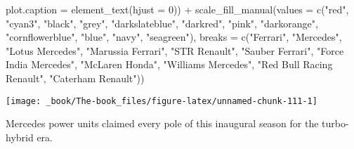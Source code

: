 \documentclass[
]{book}
\newenvironment{Shaded}{\begin{snugshade}}{\end{snugshade}}
\newcommand{\AttributeTok}[1]{\textcolor[rgb]{0.77,0.63,0.00}{#1}}
\newcommand{\DecValTok}[1]{\textcolor[rgb]{0.00,0.00,0.81}{#1}}
\newcommand{\FunctionTok}[1]{\textcolor[rgb]{0.00,0.00,0.00}{#1}}
\newcommand{\NormalTok}[1]{#1}
\newcommand{\SpecialCharTok}[1]{\textcolor[rgb]{0.00,0.00,0.00}{#1}}
\newcommand{\StringTok}[1]{\textcolor[rgb]{0.31,0.60,0.02}{#1}}
\begin{document}
\begin{Shaded}
\begin{Highlighting}[]
        \AttributeTok{plot.caption =} \FunctionTok{element\_text}\NormalTok{(}\AttributeTok{hjust =} \DecValTok{0}\NormalTok{)) }\SpecialCharTok{+}
  \FunctionTok{scale\_fill\_manual}\NormalTok{(}\AttributeTok{values =} \FunctionTok{c}\NormalTok{(}\StringTok{"red"}\NormalTok{, }
                                \StringTok{"cyan3"}\NormalTok{,  }
                                \StringTok{"black"}\NormalTok{, }
                                \StringTok{"grey"}\NormalTok{,}
                               \StringTok{"darkslateblue"}\NormalTok{, }
                                \StringTok{"darkred"}\NormalTok{,  }
                                \StringTok{"pink"}\NormalTok{, }
                                \StringTok{"darkorange"}\NormalTok{, }
                                \StringTok{"cornflowerblue"}\NormalTok{,}
                                \StringTok{"blue"}\NormalTok{,}
                               \StringTok{"navy"}\NormalTok{,}
                               \StringTok{"seagreen"}\NormalTok{),}
                     \AttributeTok{breaks =} \FunctionTok{c}\NormalTok{(}\StringTok{"Ferrari"}\NormalTok{,}
                                 \StringTok{"Mercedes"}\NormalTok{,}
                                 \StringTok{"Lotus Mercedes"}\NormalTok{,}
                                 \StringTok{"Marussia Ferrari"}\NormalTok{,}
                                \StringTok{"STR Renault"}\NormalTok{,}
                                 \StringTok{"Sauber Ferrari"}\NormalTok{, }
                                 \StringTok{"Force India Mercedes"}\NormalTok{,}
                                 \StringTok{"McLaren Honda"}\NormalTok{,}
                                 \StringTok{"Williams Mercedes"}\NormalTok{,}
                                 \StringTok{"Red Bull Racing Renault"}\NormalTok{,}
                                \StringTok{"Caterham Renault"}\NormalTok{))}
\end{Highlighting}
\end{Shaded}

\begin{center}\texttt{[image: \_book/The-book\_files/figure-latex/unnamed-chunk-111-1]} \end{center}

Mercedes power units claimed every pole of this inaugural season for the turbo-hybrid era.
\end{document}
